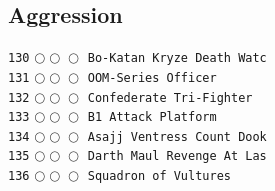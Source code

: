 \documentclass[a4paper,landscape]{article}
\begin{document}
\begin{multicols*}{5}
\section{Aggression} 
\vspace{-2mm} 
\texttt{130} \(\bigcirc\!\bigcirc\!\bigcirc\)  \texttt{Bo-Katan Kryze Death Watc} \vspace{-0.3mm}\\ 
\texttt{131} \(\bigcirc\!\bigcirc\!\bigcirc\)  \texttt{OOM-Series Officer} \vspace{-0.3mm}\\ 
\texttt{132} \(\bigcirc\!\bigcirc\!\bigcirc\)  \texttt{Confederate Tri-Fighter} \vspace{-0.3mm}\\ 
\texttt{133} \(\bigcirc\!\bigcirc\!\bigcirc\)  \texttt{B1 Attack Platform} \vspace{-0.3mm}\\ 
\texttt{134} \(\bigcirc\!\bigcirc\!\bigcirc\)  \texttt{Asajj Ventress Count Dook} \vspace{-0.3mm}\\ 
\texttt{135} \(\bigcirc\!\bigcirc\!\bigcirc\)  \texttt{Darth Maul Revenge At Las} \vspace{-0.3mm}\\ 
\texttt{136} \(\bigcirc\!\bigcirc\!\bigcirc\)  \texttt{Squadron of Vultures} \vspace{-0.3mm}\\ 

\end{multicols*}
\end{document}
